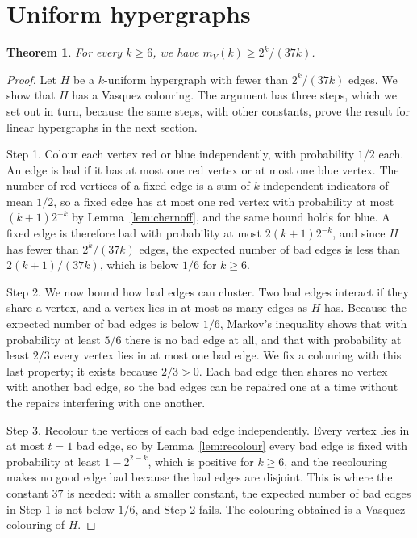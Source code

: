 \documentclass[11pt]{amsart}
\newtheorem{thm}{Theorem}[section]
\begin{document}
\section{Uniform hypergraphs}

\begin{thm}\label{thm:uniform}
For every $k \geq 6$, we have $m_V(k) \geq 2^{k}/(37 k)$.
\end{thm}

\begin{proof}
Let $H$ be a $k$-uniform hypergraph with fewer than $2^{k}/(37 k)$ edges. We show that $H$ has a Vasquez colouring. The argument has three steps, which we set out in turn, because the same steps, with other constants, prove the result for linear hypergraphs in the next section.

Step 1. Colour each vertex red or blue independently, with probability $1/2$ each. An edge is bad if it has at most one red vertex or at most one blue vertex. The number of red vertices of a fixed edge is a sum of $k$ independent indicators of mean $1/2$, so a fixed edge has at most one red vertex with probability at most $(k+1) 2^{-k}$ by Lemma~\ref{lem:chernoff}, and the same bound holds for blue. A fixed edge is therefore bad with probability at most $2(k+1) 2^{-k}$, and since $H$ has fewer than $2^{k}/(37 k)$ edges, the expected number of bad edges is less than $2(k+1)/(37 k)$, which is below $1/6$ for $k \geq 6$.

Step 2. We now bound how bad edges can cluster. Two bad edges interact if they share a vertex, and a vertex lies in at most as many edges as $H$ has. Because the expected number of bad edges is below $1/6$, Markov's inequality shows that with probability at least $5/6$ there is no bad edge at all, and that with probability at least $2/3$ every vertex lies in at most one bad edge. We fix a colouring with this last property; it exists because $2/3 > 0$. Each bad edge then shares no vertex with another bad edge, so the bad edges can be repaired one at a time without the repairs interfering with one another.

Step 3. Recolour the vertices of each bad edge independently. Every vertex lies in at most $t = 1$ bad edge, so by Lemma~\ref{lem:recolour} every bad edge is fixed with probability at least $1 - 2^{2-k}$, which is positive for $k \geq 6$, and the recolouring makes no good edge bad because the bad edges are disjoint. This is where the constant $37$ is needed: with a smaller constant, the expected number of bad edges in Step 1 is not below $1/6$, and Step 2 fails. The colouring obtained is a Vasquez colouring of $H$.
\end{proof}
\end{document}
